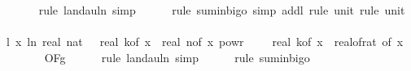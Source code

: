 \begin{isabellebody}
\ \ \ \ \ \isamarkupfalse%
\ {\isacharparenleft}{\kern0pt}rule\ landau{\isacharunderscore}{\kern0pt}ln{\isacharunderscore}{\kern0pt}{}{\isacharcomma}{\kern0pt}\ simp{\isacharparenright}{\kern0pt}\isanewline
\ \ \ \ \isamarkupfalse%
\ {\isacharparenleft}{\kern0pt}rule\ sum{\isacharunderscore}{\kern0pt}in{\isacharunderscore}{\kern0pt}bigo{\isacharcomma}{\kern0pt}\ simp\ add{\isacharcolon}{\kern0pt}l{}{\isacharcomma}{\kern0pt}\ rule\ unit{\isacharunderscore}{\kern0pt}{}{\isacharcomma}{\kern0pt}\ rule\ unit{\isacharunderscore}{\kern0pt}{}{\isacharparenright}{\kern0pt}\isanewline
\isanewline
\ \ \isamarkupfalse%
\ l{}{\isacharcolon}{\kern0pt}\ {\isachardoublequoteopen}{\isacharparenleft}{\kern0pt}{\isasymlambda}x{\isachardot}{\kern0pt}\ ln\ {\isacharparenleft}{\kern0pt}real\ {\isacharparenleft}{\kern0pt}nat\ {\isasymlceil}{}\ {\isacharasterisk}{\kern0pt}\ real\ {\isacharparenleft}{\kern0pt}k{\isacharunderscore}{\kern0pt}of\ x{\isacharparenright}{\kern0pt}\ {\isacharasterisk}{\kern0pt}\ real\ {\isacharparenleft}{\kern0pt}n{\isacharunderscore}{\kern0pt}of\ x{\isacharparenright}{\kern0pt}\ powr\ {\isacharparenleft}{\kern0pt}{}\ {\isacharminus}{\kern0pt}\ {}\ {\isacharslash}{\kern0pt}\ real\ {\isacharparenleft}{\kern0pt}k{\isacharunderscore}{\kern0pt}of\ x{\isacharparenright}{\kern0pt}{\isacharparenright}{\kern0pt}\ {\isacharslash}{\kern0pt}\ {\isacharparenleft}{\kern0pt}real{\isacharunderscore}{\kern0pt}of{\isacharunderscore}{\kern0pt}rat\ {\isacharparenleft}{\kern0pt}{\isasymdelta}{\isacharunderscore}{\kern0pt}of\ x{\isacharparenright}{\kern0pt}{\isacharparenright}{\kern0pt}\ {\isacharplus}{\kern0pt}\ {}{\isacharparenright}{\kern0pt}{\isacharparenright}{\kern0pt}\ \isanewline
\ \ \ \ {\isasymin}\ O{\isacharbrackleft}{\kern0pt}{\isacharquery}{\kern0pt}F{\isacharbrackright}{\kern0pt}{\isacharparenleft}{\kern0pt}g{\isacharparenright}{\kern0pt}{\isachardoublequoteclose}\isanewline
\ \ \ \ \isamarkupfalse%
\ {\isacharparenleft}{\kern0pt}rule\ landau{\isacharunderscore}{\kern0pt}ln{\isacharunderscore}{\kern0pt}{}{\isacharcomma}{\kern0pt}\ simp{\isacharparenright}{\kern0pt}\isanewline
\ \ \ \ \isamarkupfalse%
\ {\isacharparenleft}{\kern0pt}rule\ sum{\isacharunderscore}{\kern0pt}in{\isacharunderscore}{\kern0pt}bigo{\isacharparenright}{\kern0pt}\isanewline
\ \ \ \ \ \isamarkupfalse%

\end{isabellebody}
